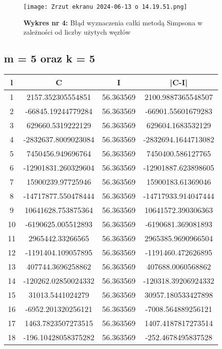 \documentclass{article}
\begin{document}
\newpage
\begin{figure}[H]
    \centering
    \texttt{[image: Zrzut ekranu 2024-06-13 o 14.19.51.png]}
    \caption{\textbf{Wykres nr 4:} Błąd wyznaczenia całki metodą Simpsona w zależności od liczby użytych węzłów}
    \label{fig:enter-label}
\end{figure}

\newpage
\subsection{m = 5 oraz k = 5}

\begin{table}[h!]
\centering
\begin{tabular}{cccc}
\toprule
l & C & I & |C-I|\\
\midrule
1 & 2157.352305554851 & 56.363569 & 2100.9887365548507 \\
2 & -66845.19244779284 & 56.363569 & -66901.55601679283 \\
3 & 629660.5319222129 & 56.363569 & 629604.1683532129 \\
4 & -2832637.8009023084 & 56.363569 & -2832694.1644713082 \\
5 & 7450456.949696764 & 56.363569 & 7450400.586127765 \\
6 & -12901831.260329604 & 56.363569 & -12901887.623898605 \\
7 & 15900239.97725946 & 56.363569 & 15900183.61369046 \\
8 & -14717877.550478444 & 56.363569 & -14717933.914047444 \\
9 & 10641628.753875364 & 56.363569 & 10641572.390306363 \\
10 & -6190625.005512893 & 56.363569 & -6190681.369081893 \\
11 & 2965442.33266565 & 56.363569 & 2965385.9690966504 \\
12 & -1191404.109057895 & 56.363569 & -1191460.472626895 \\
13 & 407744.3696258862 & 56.363569 & 407688.0060568862 \\
14 & -120262.02850024332 & 56.363569 & -120318.39206924332 \\
15 & 31013.5441024279 & 56.363569 & 30957.180533427898 \\
16 & -6952.201320256121 & 56.363569 & -7008.564889256121 \\
17 & 1463.7823507273515 & 56.363569 & 1407.4187817273514 \\
18 & -196.10428058375282 & 56.363569 & -252.4678495837528 \\

\end{tabular}
\end{table}
\end{document}
